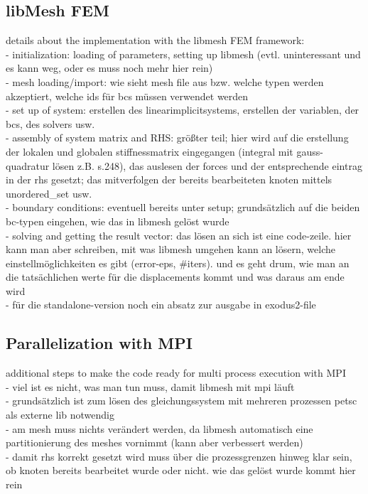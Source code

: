 \documentclass[11pt,twoside]{scrartcl}
\begin{document}
 \subsection{libMesh FEM}
 details about the implementation with the libmesh FEM framework:\\
 - initialization: loading of parameters, setting up libmesh (evtl. uninteressant und es kann weg, oder es muss noch mehr hier rein)\\
 - mesh loading/import: wie sieht mesh file aus bzw. welche typen werden akzeptiert, welche ids für bcs müssen verwendet werden\\
 - set up of system: erstellen des linearimplicitsystems, erstellen der variablen, der bcs, des solvers usw.\\
 - assembly of system matrix and RHS: größter teil; hier wird auf die erstellung der lokalen und globalen stiffnessmatrix eingegangen (integral mit gauss-quadratur lösen z.B. \cite{steinke2005finite} s.248), das auslesen der forces und der entsprechende eintrag in der rhs gesetzt; das mitverfolgen der bereits bearbeiteten knoten mittels unordered\_set usw.\\
 - boundary conditions: eventuell bereits unter setup; grundsätzlich auf die beiden bc-typen eingehen, wie das in libmesh gelöst wurde\\
 - solving and getting the result vector: das lösen an sich ist eine code-zeile. hier kann man aber schreiben, mit was libmesh umgehen kann an lösern, welche einstellmöglichkeiten es gibt (error-eps, \#iters). und es geht drum, wie man an die tatsächlichen werte für die displacements kommt und was daraus am ende wird\\
 - für die standalone-version noch ein absatz zur ausgabe in exodus2-file
 \subsection{Parallelization with MPI}
 additional steps to make the code ready for multi process execution with MPI\\
 - viel ist es nicht, was man tun muss, damit libmesh mit mpi läuft\\
 - grundsätzlich ist zum lösen des gleichungssystem mit mehreren prozessen petsc als externe lib notwendig\\
 - am mesh muss nichts verändert werden, da libmesh automatisch eine partitionierung des meshes vornimmt (kann aber verbessert werden)\\
 - damit rhs korrekt gesetzt wird muss über die prozessgrenzen hinweg klar sein, ob knoten bereits bearbeitet wurde oder nicht. wie das gelöst wurde kommt hier rein\newline
\end{document}
